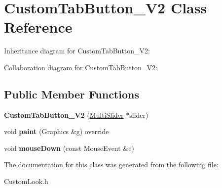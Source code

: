 \hypertarget{class_custom_tab_button___v2}{}\section{Custom\+Tab\+Button\+\_\+\+V2 Class Reference}
\label{class_custom_tab_button___v2}


Inheritance diagram for Custom\+Tab\+Button\+\_\+\+V2\+:


Collaboration diagram for Custom\+Tab\+Button\+\_\+\+V2\+:
\subsection*{Public Member Functions}
\begin{DoxyCompactItemize}
\item 
{\bfseries Custom\+Tab\+Button\+\_\+\+V2} (\hyperlink{class_multi_slider}{Multi\+Slider} $\ast$slider)\hypertarget{class_custom_tab_button___v2_a35541a6b094b8dffa70c6fe9d9973b83}{}\label{class_custom_tab_button___v2_a35541a6b094b8dffa70c6fe9d9973b83}

\item 
void {\bfseries paint} (Graphics \&g) override\hypertarget{class_custom_tab_button___v2_a9da6552f52c2a2c3b59bb418edb476ce}{}\label{class_custom_tab_button___v2_a9da6552f52c2a2c3b59bb418edb476ce}

\item 
void {\bfseries mouse\+Down} (const Mouse\+Event \&e)\hypertarget{class_custom_tab_button___v2_af6eb6b554c7a5c3411867991eda2223d}{}\label{class_custom_tab_button___v2_af6eb6b554c7a5c3411867991eda2223d}

\end{DoxyCompactItemize}


The documentation for this class was generated from the following file\+:\begin{DoxyCompactItemize}
\item 
Custom\+Look.\+h\end{DoxyCompactItemize}
